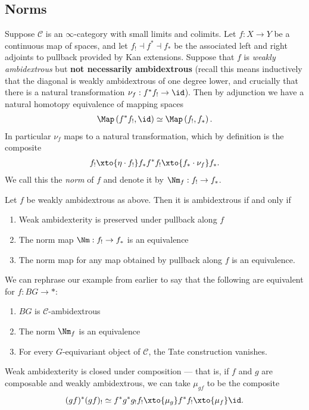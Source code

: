 \subsection{Norms}

Suppose $\mathscr{C}$ is an $\infty$-category with small limits and colimits. Let $f: X \to Y$ be a continuous map of spaces, and let $f_! \dashv f^\ast \dashv f_\ast$ be the associated left and right adjoints to pullback provided by Kan extensions. Suppose that $f$ is \textit{weakly ambidextrous} but \textbf{not necessarily ambidextrous} (recall this means inductively that the diagonal is weakly ambidextrous of one degree lower, and crucially that there is a natural transformation $\nu_f : f^\ast f_! \to \id$). Then by adjunction we have a natural homotopy equivalence of mapping spaces
\begin{align*}
    \Map \left( f^\ast f_!, \id \right) \simeq \Map \left( f_!, f_\ast \right).
\end{align*}
In particular $\nu_f$ maps to a natural transformation, which by definition is the composite
\begin{align*}
    f_! \xto{\eta \cdot f_!} f_\ast f^\ast f_! \xto{f_\ast \cdot \nu_f} f_\ast.
\end{align*}
We call this the \textit{norm} of $f$ and denote it by $\Nm_f : f_! \to f_\ast$.

\begin{proposition} Let $f$ be weakly ambidextrous as above. Then it is ambidextrous if and only if
\begin{enumerate}
    \item Weak ambidexterity is preserved under pullback along $f$
    \item The norm map $\Nm: f_! \to f_\ast$ is an equivalence
    \item The norm map for any map obtained by pullback along $f$ is an equivalence.
\end{enumerate}
\end{proposition}

\begin{example} We can rephrase our example from earlier to say that the following are equivalent for $f: BG \to \ast$:
\begin{enumerate}
    \item $BG$ is $\mathscr{C}$-ambidextrous
    \item The norm $\Nm_f$ is an equivalence
    \item For every $G$-equivariant object of $\mathscr{C}$, the Tate construction vanishes.
\end{enumerate}
\end{example}

\begin{proposition} Weak ambidexterity is closed under composition --- that is, if $f$ and $g$ are composable and weakly ambidextrous, we can take $\mu_{gf}$ to be the composite
\begin{align*}
    (gf)^\ast (gf)_! \simeq f^\ast g^\ast g_! f_! \xto{\mu_g} f^\ast f_! \xto{\mu_f} \id.
\end{align*}
\end{proposition}





